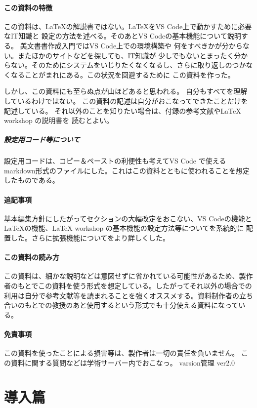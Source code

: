 \documentclass{ltjsarticle}
\begin{document}
\subsection{この資料の特徴}
この資料は、\LaTeX の解説書ではない。\LaTeX をVS Code上で動かすために必要なIT知識と
設定の方法を述べる。そのあとVS Codeの基本機能について説明する。
美文書書作成入門\cite{美文書本}ではVS Code上での環境構築や
何をすべきかが分からない。またほかのサイトなどを探しても、IT知識が
少しでもないとまったく分からない。そのためにシステムをいじりたくなくなるし、さらに取り返しのつかなくなることがまれにある。この状況を回避するために
この資料を作った。

しかし、この資料にも至らぬ点が山ほどあると思われる。
自分もすべてを理解しているわけではない。
この資料の記述は自分がおこなってできたことだけを記述している。
それ以外のことを知りたい場合は、付録の参考文献やLaTeX workshop の説明書を
読むとよい。
\subsubsection{設定用コード等について}
設定用コードは、コピー＆ペーストの利便性も考えてVS Code で使えるmarkdown形式のファイルにした。これはこの資料とともに使われることを想定したものである。
\subsection{追記事項}
基本編集方針にしたがってセクションの大幅改定をおこない、VS Codeの機能と
\LaTeX の機能、LaTeX workshop の基本機能の設定方法等についてを系統的に
配置した。さらに拡張機能についてをより詳しくした。
\subsection{この資料の読み方}
この資料は、細かな説明などは意図せずに省かれている可能性があるため、製作者のもとでこの資料を使う形式を想定している。したがってそれ以外の場合での利用は自分で参考文献等を読まれることを強くオススメする。資料制作者の立ち合いのもとでの教授のあと使用するという形式でも十分使える資料になっている。
\subsection{免責事項}
この資料を使ったことによる損害等は、製作者は一切の責任を負いません。
この資料に関する質問などは学術サーバー内でおこなっ。
varsion管理  ver2.0
\tableofcontents
\part{導入篇}
\end{document}
